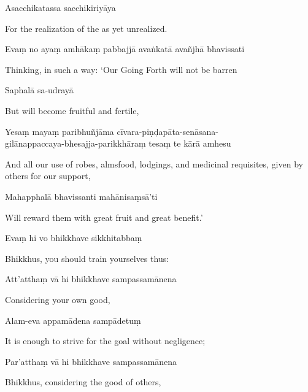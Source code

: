 Asacchikatassa sacchikiriyāya

\begin{english}
  For the realization of the as yet unrealized.
\end{english}

Evaṃ no ayaṃ amhākaṃ pabbajjā avaṅkatā avañjhā bhavissati

\begin{english}
  Thinking, in such a way: `Our Going Forth will not be barren
\end{english}

Saphalā sa-udrayā

\begin{english}
  But will become fruitful and fertile,
\end{english}

Yesaṃ mayaṃ paribhuñjāma cīvara-piṇḍapāta-senāsana-\\
gilānappaccaya-bhesajja-parikkhāraṃ tesaṃ te kārā amhesu

\begin{english}
  And all our use of robes, almsfood, lodgings, and medicinal
  requisites, given by others for our support,
\end{english}

Mahapphalā bhavissanti mahānisaṃsā'ti

\begin{english}
  Will reward them with great fruit and great benefit.'
\end{english}

Evaṃ hi vo bhikkhave sikkhitabbaṃ

\begin{english}
  Bhikkhus, you should train yourselves thus:
\end{english}

Att'atthaṃ vā hi bhikkhave sampassamānena

\begin{english}
  Considering your own good,
\end{english}

Alam-eva appamādena sampādetuṃ

\begin{english}
  It is enough to strive for the goal without negligence;
\end{english}

Par'atthaṃ vā hi bhikkhave sampassamānena

\begin{english}
  Bhikkhus, considering the good of others,
\end{english}

